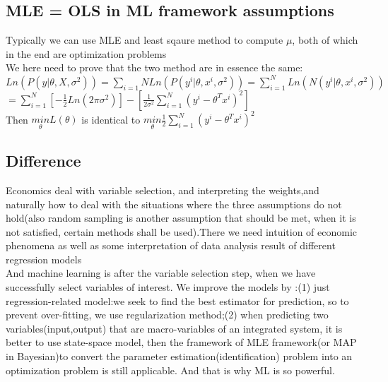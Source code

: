 \documentclass[a4paper,10pt]{article}
\begin{document}
\subsection{MLE = OLS in ML framework assumptions}
Typically we can use MLE and least sqaure method to compute $\mu$, both of which in the end are optimization problems\\
We here need to prove that the two method are in essence the same:\\
$Ln(P(y|\theta,X,\sigma^2))=\sum_{i=1}{N} Ln(P(y^{i}|\theta,x^{i},\sigma^2))= \sum_{i=1}^{N} Ln(N(y^{i}|\theta,x^{i},\sigma^2))$\\
$=\sum_{i=1}^{N} [-\frac{1}{2}Ln(2\pi\sigma^2)]-[\frac{1}{2\sigma^2}\sum_{i=1}^{N} (y^{i}-\theta^{T}x^{i})^2]$\\

Then $\underset{\theta}{min}L(\theta)$ is identical to $\underset{\theta}{min} \frac{1}{2}\sum_{i=1}^{N} (y^{i}-\theta^{T}x^{i})^2$\\


\subsection{Difference}

Economics deal with variable selection, and interpreting the weights,and naturally how to deal with the situations where the three assumptions do not hold(also random sampling is another assumption that should be met, when it is not satisfied, certain methods shall be used).There we need intuition of economic phenomena as well as some interpretation of data analysis result of different regression models\\

And machine learning \cite{friedman2001elements} is after the variable selection step, when we have successfully select variables of interest. We improve the models by :(1) just regression-related model:we seek to find the best estimator for prediction, so to prevent over-fitting, we use regularization method;(2) when predicting two variables(input,output) that are macro-variables of an integrated system, it is better to use state-space model, then the framework of MLE framework(or MAP in Bayesian)to convert the parameter estimation(identification) problem into an optimization problem is still applicable. And that is why ML is so powerful.\\
\end{document}
